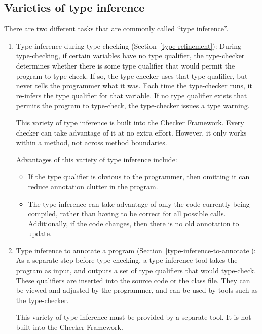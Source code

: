 \subsection{Varieties of type inference}

There are two different tasks that are commonly called ``type inference''.

\begin{enumerate}
\item
  Type inference during type-checking (Section~\ref{type-refinement}):
  During type-checking, if certain variables have no type qualifier, the
  type-checker determines whether there is some type qualifier that would
  permit the program to type-check.  If so, the type-checker uses that type
  qualifier, but never tells the programmer what it was.  Each time the
  type-checker runs, it re-infers the type qualifier for that variable.  If
  no type qualifier exists that permits the program to type-check, the
  type-checker issues a type warning.

  This variety of type inference is built into the Checker Framework.  Every
  checker can take advantage of it at no extra effort.  However, it only
  works within a method, not across method boundaries.

  Advantages of this variety of type inference include:
  \begin{itemize}
  \item
    If the type qualifier is obvious to the programmer, then omitting it
    can reduce annotation clutter in the program.
  \item
    The type inference can take advantage of only the code currently being
    compiled, rather than having to be correct for all possible calls.
    Additionally, if the code changes, then there is no old annotation to
    update.
  \end{itemize}


\item
  Type inference to annotate a program (Section~\ref{type-inference-to-annotate}):
  As a separate step before type-checking, a type inference tool takes the
  program as input, and outputs a set of type qualifiers that would
  type-check.  These qualifiers are inserted into the source code or the
  class file.  They can be viewed and adjusted by the programmer, and can
  be used by tools such as the type-checker.

  This variety of type inference must be provided by a separate tool.  It
  is not built into the Checker Framework.


\end{enumerate}
